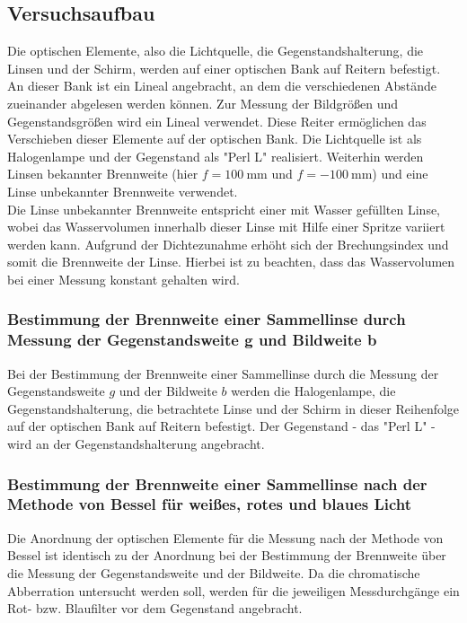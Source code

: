 \subsection{Versuchsaufbau}
\label{sec:Versuchsaufbau}

Die optischen Elemente, also die Lichtquelle, die Gegenstandshalterung, die Linsen und der
Schirm,
werden auf einer optischen Bank auf Reitern befestigt. An dieser Bank ist ein Lineal angebracht,
an dem die verschiedenen Abstände zueinander abgelesen werden können.
Zur Messung der Bildgrößen und Gegenstandsgrößen wird ein Lineal verwendet.
Diese Reiter ermöglichen das Verschieben dieser Elemente auf der optischen Bank.
Die Lichtquelle ist als Halogenlampe und der Gegenstand als "Perl L" realisiert.
Weiterhin werden Linsen bekannter Brennweite (hier $f=\SI{100}{\milli\meter}$ und
$f=-\SI{100}{\milli\meter}$) und eine Linse unbekannter Brennweite verwendet. \\
Die Linse unbekannter Brennweite entspricht einer mit Wasser gefüllten Linse, wobei das Wasservolumen
innerhalb dieser Linse mit Hilfe einer Spritze variiert werden kann. Aufgrund der
Dichtezunahme erhöht sich der Brechungsindex und somit die Brennweite der Linse.
Hierbei ist zu beachten, dass das Wasservolumen bei einer Messung konstant gehalten wird.

\subsubsection{Bestimmung der Brennweite einer Sammellinse durch Messung der Gegenstandsweite g und Bildweite b}
\label{sec:gundb}
Bei der Bestimmung der Brennweite einer Sammellinse durch die Messung der Gegenstandsweite $g$ und
der Bildweite $b$ werden die Halogenlampe, die Gegenstandshalterung, die betrachtete
Linse und der Schirm
in dieser Reihenfolge auf der optischen Bank auf Reitern befestigt.
Der Gegenstand - das "Perl L" - wird an der Gegenstandshalterung angebracht.

\subsubsection{Bestimmung der Brennweite einer Sammellinse nach der Methode von Bessel für
weißes, rotes und blaues Licht}
\label{sec:bessel}
Die Anordnung der optischen Elemente für die Messung nach der Methode von Bessel ist identisch
zu der Anordnung bei der Bestimmung der Brennweite über die Messung der Gegenstandsweite und der
Bildweite.
Da die chromatische Abberration untersucht werden soll, werden für die jeweiligen
Messdurchgänge ein Rot- bzw. Blaufilter vor dem Gegenstand angebracht.

